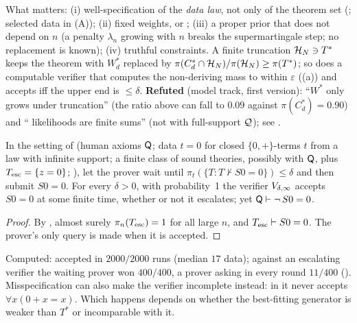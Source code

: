 \begin{remark}[Hypotheses]\label{rem:sound:hyp}
What matters: (i) well-specification of the \emph{data law}, not only of the theorem set (; selected data in (A)); (ii) fixed weights, or ; (iii) a proper prior that does not depend on $n$ (a penalty $\lambda_n$ growing with $n$ breaks the supermartingale step; no replacement is known); (iv) truthful constraints. A finite truncation $\mathcal{H}_N\ni T^*$ keeps the theorem with $W^*_d$ replaced by $\pi(C^*_d\cap\mathcal{H}_N)/\pi(\mathcal{H}_N)\ge\pi(T^*)$; so does a computable verifier that computes the non-deriving mass to within $\varepsilon$ ((a)) and accepts iff the upper end is $\le\delta$. \textbf{Refuted} (model track, first version): ``$W^*$ only grows under truncation'' (the ratio above can fall to $0.09$ against $\pi(C^*_d)=0.90$) and ``\Ltwo{} likelihoods are finite sums'' (not with full-support $\mathcal{Q}$); see .
\end{remark}

\begin{proposition}\label{prop:sound:misspec}
In the setting of  (human axioms $\mathsf{Q}$; data $t=0$ for closed $\{0,+\}$-terms $t$ from a law with infinite support; a finite class of sound theories, possibly with $\mathsf{Q}$, plus $T_{\mathrm{esc}}=\{z=0\}$; \Lzero), let the prover wait until $\pi_t(\{T:T\nvdash S0=0\})\le\delta$ and then submit $S0=0$. For every $\delta>0$, with probability~1 the verifier $V_{\delta,\infty}$ accepts $S0=0$ at some finite time, whether or not it escalates; yet $\mathsf{Q}\vdash\neg\,S0=0$.
\end{proposition}

\begin{proof}
By , almost surely $\pi_n(T_{\mathrm{esc}})=1$ for all large $n$, and $T_{\mathrm{esc}}\vdash S0=0$. The prover's only query is made when it is accepted.
\end{proof}

Computed: accepted in $2000/2000$ runs (median $17$ data); against an escalating verifier the waiting prover won $400/400$, a prover asking in every round $11/400$ (). Misspecification can also make the verifier incomplete instead: in  it never accepts $\forall x(0+x=x)$. Which happens depends on whether the best-fitting generator is weaker than $T^*$ or incomparable with it.

